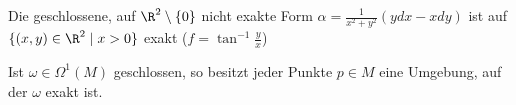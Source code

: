 \begin{exmp*}
	Die geschlossene, auf $\R^2 \setminus \{0\}$ nicht exakte Form $ \alpha = \frac{1}{x^2+y^2}(ydx-xdy) $ ist auf $ \{(x,y) \in \R^2 \mid x > 0\} $ exakt ($ f = \tan^{-1} \frac{y}{x} $)
\end{exmp*}

\begin{cor}
	Ist $ \omega \in \Omega^1(M)$ geschlossen, so besitzt jeder Punkte $ p \in M $ eine Umgebung, auf der $\omega$ exakt ist.
\end{cor}